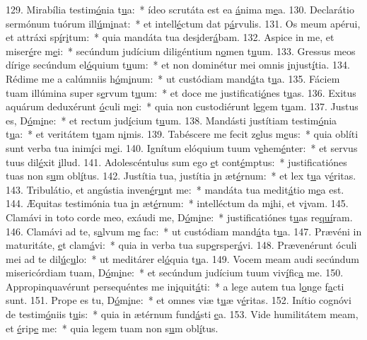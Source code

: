129. Mirabília testim\uline{ó}nia t\uline{u}a:~* ídeo scrutáta est ea \uline{á}nima m\uline{e}a.
130. Declarátio sermónum tuórum ill\uline{ú}m\uline{i}nat:~* et intell\uline{é}ctum dat p\uline{á}rvulis.
131. Os meum apérui, et attráxi sp\uline{í}r\uline{i}tum:~* quia mandáta tua des\uline{i}der\uline{á}bam.
132. Aspice in me, et miser\uline{é}re m\uline{e}i:~* secúndum judícium diligéntium n\uline{o}men t\uline{u}um.
133. Gressus meos dírige secúndum el\uline{ó}quium t\uline{u}um:~* et non dominétur mei omnis \uline{i}njust\uline{í}tia.
134. Rédime me a calúmniis h\uline{ó}m\uline{i}num:~* ut custódiam mand\uline{á}ta t\uline{u}a.
135. Fáciem tuam illúmina super s\uline{e}rvum t\uline{u}um:~* et doce me justificati\uline{ó}nes t\uline{u}as.
136. Exitus aquárum deduxérunt \uline{ó}culi m\uline{e}i:~* quia non custodiérunt l\uline{e}gem t\uline{u}am.
137. Justus es, D\uline{ó}m\uline{i}ne:~* et rectum jud\uline{í}cium t\uline{u}um.
138. Mandásti justítiam testim\uline{ó}nia t\uline{u}a:~* et veritátem t\uline{u}am n\uline{i}mis.
139. Tabéscere me fecit z\uline{e}lus m\uline{e}us:~* quia oblíti sunt verba tua inim\uline{í}ci m\uline{e}i.
140. Ignítum elóquium tuum v\uline{e}hem\uline{é}nter:~* et servus tuus dil\uline{é}xit \uline{i}llud.
141. Adolescéntulus sum ego \uline{e}t cont\uline{é}mptus:~* justificatiónes tuas non s\uline{u}m obl\uline{í}tus.
142. Justítia tua, justítia \uline{i}n æt\uline{é}rnum:~* et lex t\uline{u}a v\uline{é}ritas.
143. Tribulátio, et angústia inven\uline{é}r\uline{u}nt me:~* mandáta tua medit\uline{á}tio m\uline{e}a est.
144. Æquitas testimónia tua \uline{i}n æt\uline{é}rnum:~* intelléctum da m\uline{i}hi, et v\uline{i}vam.
145. Clamávi in toto corde meo, exáudi me, D\uline{ó}m\uline{i}ne:~* justificatiónes t\uline{u}as re\uline{quí}ram.
146. Clamávi ad te, s\uline{a}lvum m\uline{e} fac:~* ut custódiam mand\uline{á}ta t\uline{u}a.
147. Prævéni in maturitáte, \uline{e}t clam\uline{á}vi:~* quia in verba tua sup\uline{e}rsper\uline{á}vi.
148. Prævenérunt óculi mei ad te dil\uline{ú}c\uline{u}lo:~* ut meditárer el\uline{ó}quia t\uline{u}a.
149. Vocem meam audi secúndum misericórdiam tuam, D\uline{ó}m\uline{i}ne:~* et secúndum judícium tuum viv\uline{í}fic\uline{a} me.
150. Appropinquavérunt persequéntes me in\uline{i}quit\uline{á}ti:~* a lege autem tua l\uline{o}nge f\uline{a}cti sunt.
151. Prope es tu, D\uline{ó}m\uline{i}ne:~* et omnes viæ t\uline{u}æ v\uline{é}ritas.
152. Inítio cognóvi de testim\uline{ó}niis t\uline{u}is:~* quia in ætérnum fund\uline{á}sti \uline{e}a.
153. Vide humilitátem meam, et \uline{é}rip\uline{e} me:~* quia legem tuam non s\uline{u}m obl\uline{í}tus.
